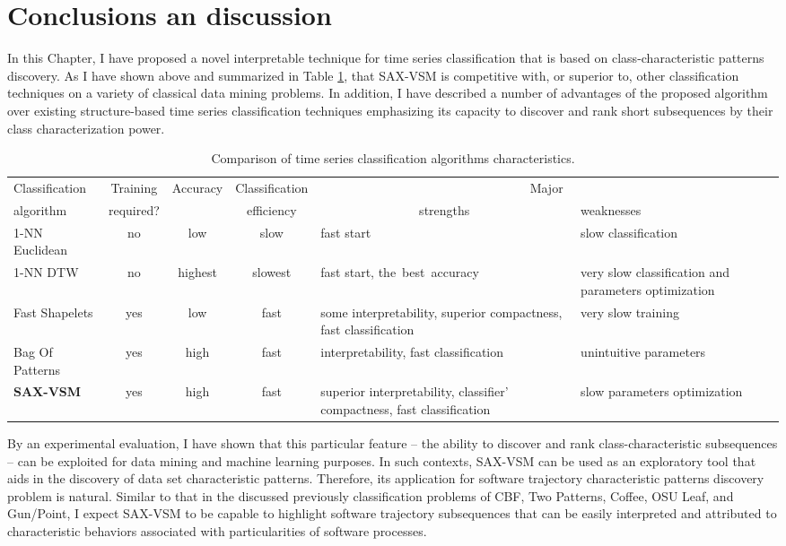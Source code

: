 \section{Conclusions an discussion} \label{conclusion}
In this Chapter, I have proposed a novel interpretable technique for time series classification that is based on class-characteristic patterns discovery. As I have shown above and summarized in Table \ref{saxvsm_table2}, that SAX-VSM is competitive with, or superior to, other classification techniques on a variety of classical data mining problems. In addition, I have described a number of advantages of the proposed algorithm over existing structure-based time series classification techniques emphasizing its capacity to discover and rank short subsequences by their class characterization power. 
\begin{table}[t]
\caption{Comparison of time series classification algorithms characteristics.}
\label{saxvsm_table2}
\centering
\begin{small}
\begin{tabularx}{\linewidth}{| l | c | c | c | X | X |}
\hline
Classification & Training & Accuracy & Classification & \multicolumn{2}{c|}{Major} \\
algorithm & required? & & efficiency & \multicolumn{1}{c}{strengths} & weaknesses \\
\hline
1-NN Euclidean & no & low & slow & fast start & slow classification \\
\hline
1-NN DTW & no & highest & slowest & fast start, \mbox{the best accuracy} &  very slow classification and parameters optimization \\
\hline
Fast Shapelets & yes & low & fast & some interpretability, superior compactness, fast classification & very slow training \\
\hline
Bag Of Patterns & yes & high & fast & interpretability, fast classification & unintuitive parameters \\
\hline
\textbf{SAX-VSM} & yes & high & fast & superior interpretability, classifier' compactness, fast classification & slow parameters optimization\\ 
\hline
\end{tabularx}
\end{small}
\end{table}

By an experimental evaluation, I have shown that this particular feature -- the ability to discover and rank class-characteristic subsequences -- can be exploited for data mining and machine learning purposes. In such contexts, SAX-VSM can be used as an 
exploratory tool that aids in the discovery of data set characteristic patterns. Therefore, its application for software trajectory characteristic patterns discovery problem is natural. Similar to that in the discussed previously classification problems of CBF, Two Patterns, Coffee, OSU Leaf, and Gun/Point, I expect SAX-VSM to be capable to highlight software trajectory subsequences that can be easily interpreted and attributed to characteristic behaviors associated with particularities of software processes.

